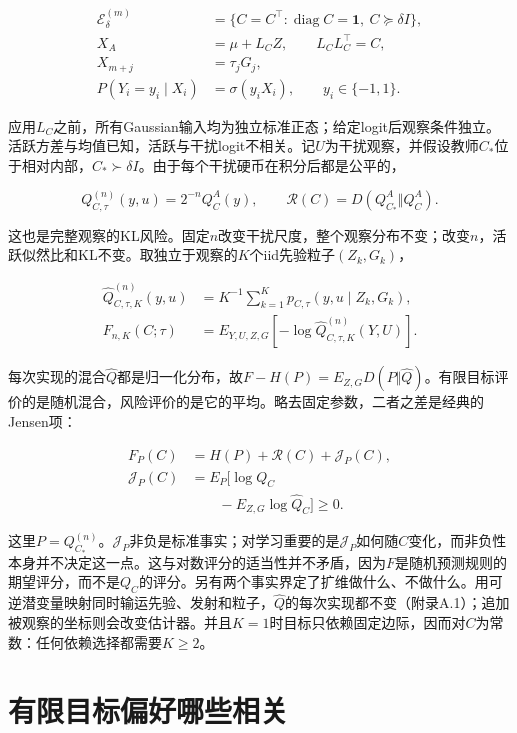 \documentclass[11pt,a4paper]{article}
\begin{document}
\[
\begin{aligned}
\mathcal E_\delta^{(m)}
&=\{C=C^\top:\operatorname{diag}C=\mathbf1,\ C\succeq\delta I\},\\
X_A&=\mu+L_CZ,\qquad L_CL_C^\top=C,\\
X_{m+j}&=\tau_jG_j,\\
P(Y_i=y_i\mid X_i)&=\sigma(y_iX_i),\qquad y_i\in\{-1,1\}.
\end{aligned}
\tag{1}
\]

应用\(L_C\)之前，所有Gaussian输入均为独立标准正态；给定logit后观察条件独立。活跃方差与均值已知，活跃与干扰logit不相关。记\(U\)为干扰观察，并假设教师\(C_*\)位于相对内部，\(C_*\succ\delta I\)。由于每个干扰硬币在积分后都是公平的，

\[
Q_{C,\tau}^{(n)}(y,u)=2^{-n}Q_C^A(y),\qquad
\mathcal R(C)=D(Q_{C_*}^A\Vert Q_C^A).
\tag{2}
\]

这也是完整观察的KL风险。固定\(n\)改变干扰尺度，整个观察分布不变；改变\(n\)，活跃似然比和KL不变。取独立于观察的\(K\)个iid先验粒子\((Z_k,G_k)\)，

\[
\begin{aligned}
\widehat Q_{C,\tau,K}^{(n)}(y,u)
&=K^{-1}\sum_{k=1}^Kp_{C,\tau}(y,u\mid Z_k,G_k),\\
F_{n,K}(C;\tau)&=E_{Y,U,Z,G}[-\log\widehat Q_{C,\tau,K}^{(n)}(Y,U)].
\end{aligned}
\tag{3}
\]

每次实现的混合\(\widehat Q\)都是归一化分布，故\(F-H(P)=E_{Z,G}D(P\Vert\widehat Q)\)。有限目标评价的是随机混合，风险评价的是它的平均。略去固定参数，二者之差是经典的Jensen项：

\[
\begin{aligned}
F_P(C)&=H(P)+\mathcal R(C)+\mathcal J_P(C),\\
\mathcal J_P(C)&=E_P[\log Q_C\\
&\qquad -E_{Z,G}\log\widehat Q_C]\ge0.
\end{aligned}
\tag{4}
\]

这里\(P=Q_{C_*}^{(n)}\)。\(\mathcal J_P\)非负是标准事实；对学习重要的是\(\mathcal J_P\)如何随\(C\)变化，而非负性本身并不决定这一点。这与对数评分的适当性并不矛盾，因为\(F\)是随机预测规则的期望评分，而不是\(Q_C\)的评分。另有两个事实界定了扩维做什么、不做什么。用可逆潜变量映射同时输运先验、发射和粒子，\(\widehat Q\)的每次实现都不变（附录A.1）；追加被观察的坐标则会改变估计器。并且\(K=1\)时目标只依赖固定边际，因而对\(C\)为常数：任何依赖选择都需要\(K\ge2\)。

\section{有限目标偏好哪些相关}\label{ux6709ux9650ux76eeux6807ux504fux597dux54eaux4e9bux76f8ux5173}
\end{document}
